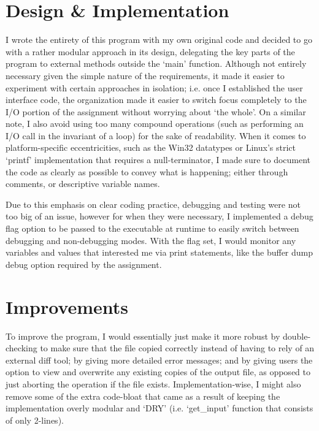 \documentclass[12pt]{article}
\begin{document}
\section*{Design \& Implementation}
I wrote the entirety of this program with my own original code and decided to go with a rather modular approach in its design, delegating the key 
parts of the program to external methods outside the `main' function.  Although not entirely necessary given the simple nature of the requirements, 
it made it easier to experiment with certain approaches in isolation; i.e. once I established the user interface code, the organization made it easier 
to switch focus completely to the I/O portion of the assignment without worrying about `the whole'.  On a similar note, I also avoid using too many 
compound operations (such as performing an I/O call in the invariant of a loop) for the sake of readability.  When it comes to platform-specific 
eccentricities, such as the Win32 datatypes or Linux's strict `printf' implementation that requires a null-terminator, I made sure to document the code 
as clearly as possible to convey what is happening; either through comments, or descriptive variable names. 

Due to this emphasis on clear coding practice, debugging and testing were not too big of an issue, however for when they were necessary, I implemented
a debug flag option to be passed to the executable at runtime to easily switch between debugging and non-debugging modes. With the flag set, I would
monitor any variables and values that interested me via print statements, like the buffer dump debug option required by the assignment. 


\section*{Improvements}
To improve the program, I would essentially just make it more robust by double-checking to make sure that the file copied correctly instead of
having to rely of an external diff tool; by giving more detailed error messages; and by giving users the option to view and overwrite any existing 
copies of the output file, as opposed to just aborting the operation if the file exists.  Implementation-wise, I might also remove some of the extra 
code-bloat that came as a result of keeping the implementation overly modular and `DRY' (i.e. `get\_input' function that consists of only 2-lines). 


\newpage
\end{document}
